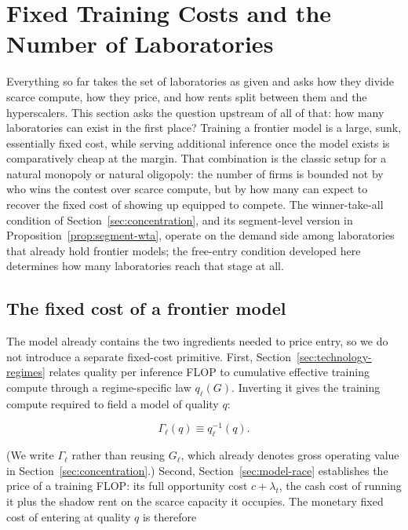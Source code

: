 \documentclass[11pt]{article}
\begin{document}
\section{Fixed Training Costs and the Number of Laboratories}
\label{sec:natural-oligopoly}

Everything so far takes the set of laboratories as given and asks how they divide scarce compute, how they price, and how rents split between them and the hyperscalers. This section asks the question upstream of all of that: how many laboratories can exist in the first place? Training a frontier model is a large, sunk, essentially fixed cost, while serving additional inference once the model exists is comparatively cheap at the margin. That combination is the classic setup for a natural monopoly or natural oligopoly: the number of firms is bounded not by who wins the contest over scarce compute, but by how many can expect to recover the fixed cost of showing up equipped to compete. The winner-take-all condition of Section~\ref{sec:concentration}, and its segment-level version in Proposition~\ref{prop:segment-wta}, operate on the demand side among laboratories that already hold frontier models; the free-entry condition developed here determines how many laboratories reach that stage at all.

\subsection{The fixed cost of a frontier model}
\label{subsec:entry-cost}

The model already contains the two ingredients needed to price entry, so we do not introduce a separate fixed-cost primitive. First, Section~\ref{sec:technology-regimes} relates quality per inference FLOP to cumulative effective training compute through a regime-specific law $q_\ell(G)$. Inverting it gives the training compute required to field a model of quality $q$:

\begin{equation}\Gamma_\ell(q)\equiv q_\ell^{-1}(q).\end{equation}

(We write $\Gamma_\ell$ rather than reusing $G_\ell$, which already denotes gross operating value in Section~\ref{sec:concentration}.) Second, Section~\ref{sec:model-race} establishes the price of a training FLOP: its full opportunity cost $c+\lambda_t$, the cash cost of running it plus the shadow rent on the scarce capacity it occupies. The monetary fixed cost of entering at quality $q$ is therefore
\end{document}
